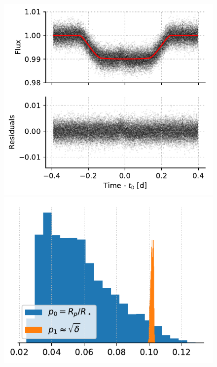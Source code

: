 \begin{figure}%
    \centering
    \includegraphics[scale=0.75]{robin/hd80606_residuals.pdf}
    \includegraphics[scale=0.75]{robin/hd80606_agreement.pdf}

\end{figure}
